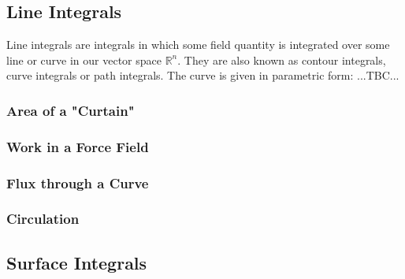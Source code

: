 
\subsection{Line Integrals}
Line integrals are integrals in which some field quantity is integrated over some line or curve in our vector space $\mathbb{R}^n$. They are also known as contour integrals, curve integrals or path integrals. The curve is given in parametric form:
...TBC...

\subsubsection{Area of a "Curtain"}



\subsubsection{Work in a Force Field}


\subsubsection{Flux through a Curve}


\subsubsection{Circulation}




\subsection{Surface Integrals}
